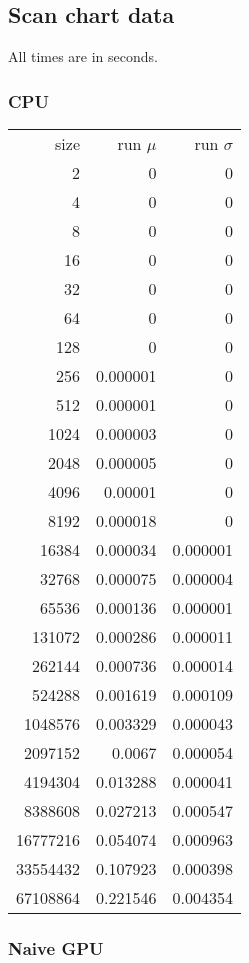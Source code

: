 \subsection{Scan chart data}
\label{sec:scan_chart_data}

All times are in seconds.

\subsubsection{CPU}

\begin{tabular}{r r r}
size & run $\mu$ & run $\sigma$ \\
2 & 0 & 0 \\
4 & 0 & 0 \\
8 & 0 & 0 \\
16 & 0 & 0 \\
32 & 0 & 0 \\
64 & 0 & 0 \\
128 & 0 & 0 \\
256 & 0.000001 & 0 \\
512 & 0.000001 & 0 \\
1024 & 0.000003 & 0 \\
2048 & 0.000005 & 0 \\
4096 & 0.00001 & 0 \\
8192 & 0.000018 & 0 \\
16384 & 0.000034 & 0.000001 \\
32768 & 0.000075 & 0.000004 \\
65536 & 0.000136 & 0.000001 \\
131072 & 0.000286 & 0.000011 \\
262144 & 0.000736 & 0.000014 \\
524288 & 0.001619 & 0.000109 \\
1048576 & 0.003329 & 0.000043 \\
2097152 & 0.0067 & 0.000054 \\
4194304 & 0.013288 & 0.000041 \\
8388608 & 0.027213 & 0.000547 \\
16777216 & 0.054074 & 0.000963 \\
33554432 & 0.107923 & 0.000398 \\
67108864 & 0.221546 & 0.004354 \\
\end{tabular}

\subsubsection{Naive GPU}

